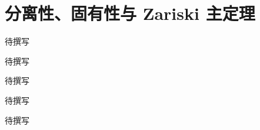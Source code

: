 
% 
% 

\chapter{分离性、固有性与 Zariski 主定理}
\label{g5:ch:12}

\begin{chapterabstract}
待撰写
\end{chapterabstract}

\begin{learninggoals}
待撰写
\end{learninggoals}

待撰写







\begin{chaptersummary}
待撰写
\end{chaptersummary}

\BookExercises
待撰写

